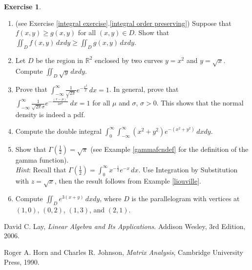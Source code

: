 \documentclass[12pt,letterpaper]{book}
\numberwithin{equation}{section}
\theoremstyle{definition}
\newtheorem{exercise}{\textbf{Exercise}}[chapter]
\begin{document}
\begin{exercise} \label{double integral exercise} \quad
\begin{enumerate}[\bfseries 1.]

\item\label{double integral order} (see Exercise \ref{integral exercise}.\ref{integral order preserving}) Suppose that $f(x,y)\geq g(x,y)$ for all $(x,y)\in D$. Show that $\displaystyle{\iint_D f(x,y)\,dxdy\geq \iint_D g(x,y)\,dxdy}$.

\item Let $D$ be the region in $\mathbb{R}^2$ enclosed by two curves $y=x^2$ and $y=\sqrt{x}$. Compute $\displaystyle{\iint_D \sqrt{y}\,dxdy}$.

\item\label{normaldensity} Prove that $\displaystyle{\int_{-\infty}^\infty \frac{1}{\sqrt{2\pi}}e^{-\frac{x^2}{2}}\,dx=1}$. In general, prove that $\displaystyle{\int_{-\infty}^\infty \frac{1}{\sqrt{2\pi}\sigma}e^{-\frac{(x-\mu)^2}{2\sigma^2}}\,dx=1}$ for all $\mu$ and $\sigma$, $\sigma>0$. This shows that the normal density is indeed a pdf.

\item Compute the double integral $\displaystyle{\int_0^\infty \int_{-\infty}^\infty (x^2+y^2)e^{-(x^2+y^2)}\,dxdy}$.

\item Show that $\Gamma(\frac{1}{2})=\sqrt{\pi}$ (see Example \ref{gammafcndef} for the definition of the gamma function). \\\textit{Hint}: Recall that $\Gamma(\frac{1}{2})=\displaystyle{\int_0^\infty x^{-\frac{1}{2}}e^{-x}\,dx}$. Use Integration by Substitution with $z=\sqrt{x}$, then the result follows from Example \ref{liouville}.

\item Compute $\displaystyle{\iint_D e^{3(x+y)}\,dxdy}$, where $D$ is the parallelogram with vertices at $(1,0)$, $(0,2)$, $(1,3)$, and $(2,1)$.
\end{enumerate}
\end{exercise}


\begin{thebibliography}{9}

  David C. Lay,
  \emph{Linear Algebra and Its Applications}.
  Addison Wesley, 3rd Edition, 2006.

  Roger A. Horn and Charles R. Johnson,
   \emph{Matrix Analysis},
   Cambridge University Press, 1990.

\end{thebibliography}

%
%

\printindex
\end{document}
